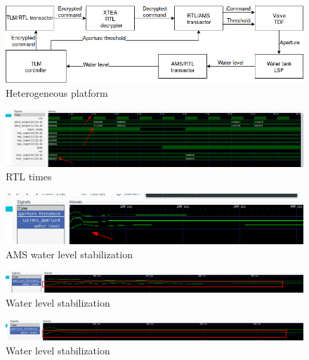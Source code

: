 \documentclass[]{IEEEtran}
\begin{document}



\appendix

\begin{figure}[bt]
\centering
\includegraphics[width=\textwidth]{figures/system.png}
\caption{Heterogeneous platform}
\label{fig:system}
\end{figure}

\begin{figure}[bt]
\centering
\includegraphics[width=\textwidth]{figures/rtl_time.png}
\caption{RTL times}
\label{fig:rtltime}
\end{figure}

\begin{figure}[bt]
\centering
\includegraphics[width=\textwidth]{figures/watertank_ams.png}
\caption{AMS water level stabilization}
\label{fig:watertank_ams}
\end{figure}

\begin{figure}[bt]
\centering
\includegraphics[width=\textwidth]{figures/watertank_system_5.png}
\caption{Water level stabilization}
\label{fig:watertank_system_5}
\end{figure}

\begin{figure}[bt]
\centering
\includegraphics[width=\textwidth]{figures/watertank_system_2.png}
\caption{Water level stabilization}
\label{fig:watertank_system_2}
\end{figure}
\end{document}

